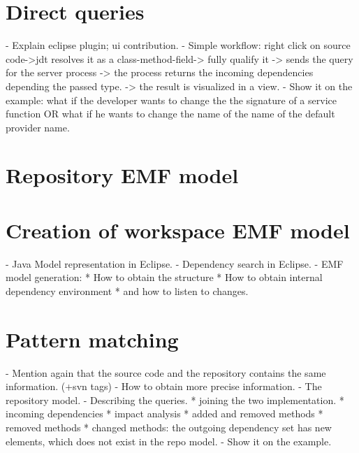 \section{Direct queries}
- Explain eclipse plugin; ui contribution.
- Simple workflow: right click on source code->jdt resolves it as a
class-method-field-> fully qualify it -> sends the query for the server process
-> the process returns the incoming dependencies depending the passed type. ->
the result is visualized in a view.
- Show it on the example: what if the developer wants to change the the
signature of a service function OR what if he wants to change the name of the
name of the default provider name.

\section{Repository EMF model}

\section{Creation of workspace EMF model}
- Java Model representation in Eclipse. 
- Dependency search in Eclipse.
- EMF model generation:
 * How to obtain the structure 
 * How to obtain internal dependency environment
 * and how to listen to changes.

\section{Pattern matching}
- Mention again that the source code and the repository contains the same information. (+svn tags)
- How to obtain more precise information.
- The repository model. 
- Describing the queries.
* joining the two implementation. 
* incoming dependencies
* impact analysis
  * added and removed methods
  * removed methods
  * changed methods: the outgoing dependency set has new elements, which does not exist in the repo model. 
-  Show it on the example.
